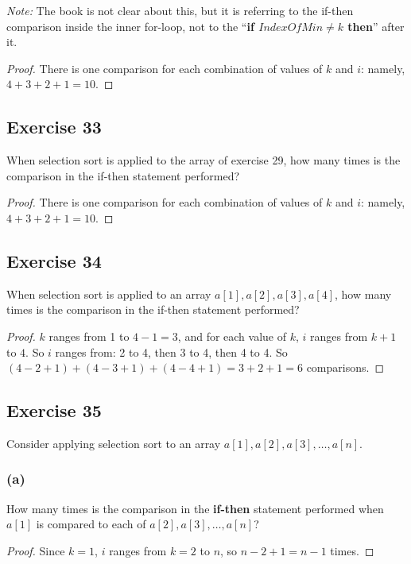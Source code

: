 \documentclass[14pt]{extarticle}
\begin{document}
{\it Note:} The book is not clear about this, but it is referring to the if-then comparison inside the inner for-loop,
not to the ``{\bf if \(IndexOfMin \neq k\) then}'' after it.

\begin{proof}
    There is one comparison for each combination of values of \(k\) and \(i\): namely, \(4 + 3 + 2 + 1 = 10\).
\end{proof}

\subsection{Exercise 33}
When selection sort is applied to the array of exercise 29, how many times is the comparison in the if-then statement
performed?

\begin{proof}
    There is one comparison for each combination of values of \(k\) and \(i\): namely, \(4 + 3 + 2 + 1 = 10\).
\end{proof}

\subsection{Exercise 34}
When selection sort is applied to an array \(a[1], a[2], a[3], a[4]\), how many times is the comparison in the if-then
statement performed?

\begin{proof}
    \(k\) ranges from 1 to \(4-1=3\), and for each value of \(k\), \(i\) ranges from \(k+1\) to \(4\). So \(i\) ranges from:
    2 to 4, then 3 to 4, then 4 to 4. So \((4-2+1) + (4-3+1) + (4-4+1) = 3+2+1 = 6\) comparisons.
\end{proof}

\subsection{Exercise 35}
Consider applying selection sort to an array \(a[1], a[2], a[3], \ldots, a[n]\).

\subsubsection{(a)}
How many times is the comparison in the {\bf if-then} statement performed when \(a[1]\) is compared to each of
\(a[2], a[3], \ldots, a[n]\)?

\begin{proof}
    Since \(k = 1\), \(i\) ranges from \(k=2\) to \(n\), so \(n-2+1 = n-1\) times.
\end{proof}
\end{document}

